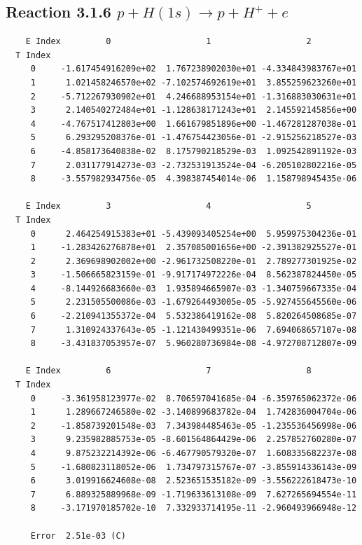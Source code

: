 \documentclass[12pt,dvipdfmx]{article}
\begin{document}
\newpage
\subsection{
Reaction 3.1.6 $   p + H(1s) \rightarrow p + H^+ + e$}


\begin{small}\begin{verbatim}
    E Index         0                   1                   2
  T Index
     0     -1.617454916209e+02  1.767238902030e+01 -4.334843983767e+01
     1      1.021458246570e+02 -7.102574692619e+01  3.855259623260e+01
     2     -5.712267930902e+01  4.246688953154e+01 -1.316883030631e+01
     3      2.140540272484e+01 -1.128638171243e+01  2.145592145856e+00
     4     -4.767517412803e+00  1.661679851896e+00 -1.467281287038e-01
     5      6.293295208376e-01 -1.476754423056e-01 -2.915256218527e-03
     6     -4.858173640838e-02  8.175790218529e-03  1.092542891192e-03
     7      2.031177914273e-03 -2.732531913524e-04 -6.205102802216e-05
     8     -3.557982934756e-05  4.398387454014e-06  1.158798945435e-06

    E Index         3                   4                   5
  T Index
     0      2.464254915383e+01 -5.439093405254e+00  5.959975304236e-01
     1     -1.283426276878e+01  2.357085001656e+00 -2.391382925527e-01
     2      2.369698902002e+00 -2.961732508220e-01  2.789277301925e-02
     3     -1.506665823159e-01 -9.917174972226e-04  8.562387824450e-05
     4     -8.144926683660e-03  1.935894665907e-03 -1.340759667335e-04
     5      2.231505500086e-03 -1.679264493005e-05 -5.927455645560e-06
     6     -2.210941355372e-04  5.532386419162e-08  5.820264508685e-07
     7      1.310924337643e-05 -1.121430499351e-06  7.694068657107e-08
     8     -3.431837053957e-07  5.960280736984e-08 -4.972708712807e-09

    E Index         6                   7                   8
  T Index
     0     -3.361958123977e-02  8.706597041685e-04 -6.359765062372e-06
     1      1.289667246580e-02 -3.140899683782e-04  1.742836004704e-06
     2     -1.858739201548e-03  7.343984485463e-05 -1.235536456998e-06
     3      9.235982885753e-05 -8.601564864429e-06  2.257852760280e-07
     4      9.875232214392e-06 -6.467790579320e-07  1.608335682237e-08
     5     -1.680823118052e-06  1.734797315767e-07 -3.855914336143e-09
     6      3.019916624608e-08  2.523651535182e-09 -3.556222618473e-10
     7      6.889325889968e-09 -1.719633613108e-09  7.627265694554e-11
     8     -3.171970185702e-10  7.332933714195e-11 -2.960493966948e-12

     Error  2.51e-03 (C)
\end{verbatim}\end{small}
\end{document}
